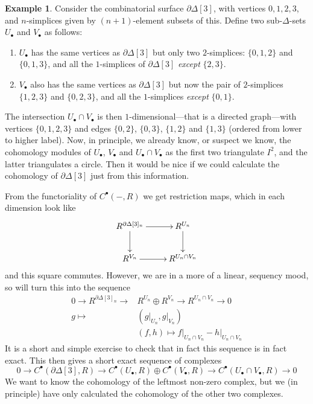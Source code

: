 \documentclass{tufte-handout}
\theoremstyle{definition}
\newtheorem{example}{Example}
\begin{document}
\begin{example}
Consider the combinatorial surface $\partial\Delta[3]$, with vertices $0,1,2,3$, and 
$n$-simplices given by $(n+1)$-element subsets of this.
Define two sub-$\Delta$-sets $U_\bullet$ and $V_\bullet$ as follows:
\begin{enumerate}
\item $U_\bullet$ has the same vertices as $\partial\Delta[3]$ but only two $2$-simplices: 
$\{0,1,2\}$ and $\{0,1,3\}$, and all the $1$-simplices of $\partial \Delta[3]$ \emph{except}
$\{2,3\}$.
\item $V_\bullet$ also has the same vertices as $\partial\Delta[3]$ but now the pair of $2$-simplices
$\{1,2,3\}$ and $\{0,2,3\}$, and all the $1$-simplices \emph{except} $\{0,1\}$.
\end{enumerate}
The 
intersection $U_\bullet\cap V_\bullet$ is then $1$-dimensional---that is a directed graph---with 
vertices $\{0,1,2,3\}$ and edges $\{0,2\}$, $\{0,3\}$, $\{1,2\}$ and $\{1,3\}$ (ordered from
lower to higher label). Now, in principle,
we already know, or suspect we know, the cohomology modules of $U_\bullet$, $V_\bullet$ and 
$U_\bullet\cap V_\bullet$ as the first two triangulate $I^2$, and the latter triangulates a 
circle. Then it would be nice if we could calculate the cohomology of $\partial\Delta[3]$ just
from this information.

From the functoriality of $C^\bullet(-,R)$ we get restriction maps, which in each dimension 
look like
\[
	\xymatrix{
		R^{\partial\Delta[3]_n} \ar[r] \ar[d] & R^{U_n} \ar[d]\\
		R^{V_n} \ar[r] & R^{U_n\cap V_n}
	}
\]
and this square commutes. However, we are in a more of a linear, sequency mood, so will turn
this into the sequence
\begin{align*}
	0\to R^{\partial\Delta[3]_n} \to & R^{U_n}\oplus R^{V_n} \to R^{U_n\cap V_n}\to 0\\
	g\mapsto & (g\big|_{U_n},g\big|_{V_n})\\
		& (f,h) \mapsto f\big|_{U_n\cap V_n} - h\big|_{U_n\cap V_n}
\end{align*}
It is a short and simple exercise to check that in fact this sequence is in fact exact. This then
gives a short exact sequence of complexes
\[
0\to C^\bullet(\partial\Delta[3],R) \to C^\bullet(U_\bullet,R) \oplus C^\bullet(V_\bullet,R) \to C^\bullet(U_\bullet\cap V_\bullet,R) \to 0
\]
We want to know the cohomology of the leftmost non-zero complex, but we (in principle) have
only calculated the cohomology of the other two complexes.
\end{example}
\end{document}

